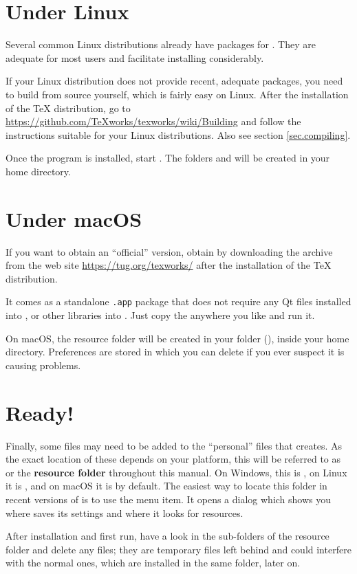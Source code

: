 \section{Under Linux}

Several common Linux distributions already have packages for {\Tw}. They are adequate for most users and facilitate installing {\Tw} considerably.

If your Linux distribution does not provide recent, adequate packages, you need to build {\Tw} from source yourself, which is fairly easy on Linux. After the installation of the {\TeX} distribution, go to \url{https://github.com/TeXworks/texworks/wiki/Building} and follow the instructions suitable for your Linux distributions. Also see section \ref{sec.compiling}.

Once the program is installed, start {\Tw}. The folders  and  will be created in your home directory.

\section{Under macOS}

If you want to obtain an ``official'' version, obtain {\Tw} by downloading the archive from the {\Tw} web site \url{https://tug.org/texworks/} after the installation of the {\TeX} distribution.

It comes as a standalone \texttt{.app} package that does not require any Qt files installed into , or other libraries into . Just copy the  anywhere you like and run it.

On macOS, the {\Tw} resource folder will be created in your  folder (), inside your home directory. Preferences are stored in 
which you can delete if you ever suspect it is causing problems.

\section{Ready!}

Finally, some files may need to be added to the ``personal'' files that {\Tw} creates. As the exact location of these depends on your platform, this will be referred to as  or the \textbf{{\Tw} resource folder} throughout this manual. On Windows, this is , on Linux it is , and on macOS it is  by default. The easiest way to locate this folder in recent versions of {\Tw} is to use the \submenu{} menu item. It opens a dialog which shows you where {\Tw} saves its settings and where it looks for resources.

After installation and first run, have a look in the sub-folders of the {\Tw} resource folder and delete any  files; they are temporary files left behind and could interfere with the normal ones, which are installed in the same folder, later on.